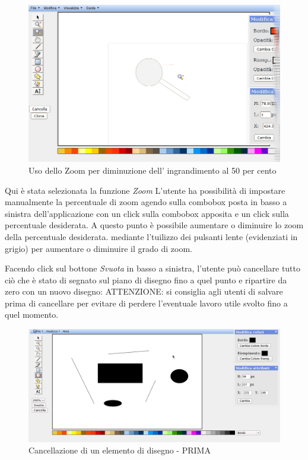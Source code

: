 \begin{figure}[!ht]
\centering
\includegraphics[scale=4]{images/zoom_meno.png}
\caption{Uso dello Zoom per diminuzione dell' ingrandimento al 50 per cento}
\end{figure} 

\vspace{100pt}
Qui \`e stata selezionata la funzione \textit{Zoom} L'utente ha possibilit\`a di impostare manualmente la percentuale di zoom agendo sulla combobox posta in basso a sinistra dell'applicazione con un click sulla combobox apposita e un click sulla percentuale desiderata. A questo punto è possibile aumentare o diminuire lo zoom della percentuale desiderata. mediante l'tuilizzo dei pulsanti lente (evidenziati in grigio) per aumentare o diminuire il grado di zoom.
 

\vspace{100pt}
Facendo click sul bottone \textit{Svuota} in basso a sinistra, l'utente pu\`o cancellare tutto ci\`o che \`e stato di segnato sul piano di disegno fino a quel punto e ripartire da zero con un nuovo disegno: ATTENZIONE: si consiglia agli utenti di salvare prima di cancellare per evitare di perdere l'eventuale lavoro utile svolto fino a quel momento.

\begin{figure}[!ht]
\centering
\includegraphics[scale=4]{images/cancella_elemento_prima.png}
\caption{Cancellazione di un elemento di disegno  - PRIMA}
\end{figure} 

